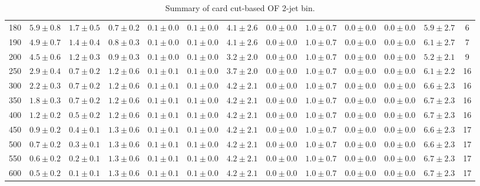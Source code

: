 \begin{table}
{\begin{center}
\begin{tabular}{l | c c | c c c c c c c c  | c c}
180 & $5.9\pm0.8$ & $1.7\pm0.5$ & $0.7\pm0.2$ & $0.1\pm0.0$ & $0.1\pm0.0$ & $4.1\pm2.6$ & $0.0\pm0.0$ & $1.0\pm0.7$ & $0.0\pm0.0$ & $0.0\pm0.0$ & $5.9\pm2.7$ & 6 \\
190 & $4.9\pm0.7$ & $1.4\pm0.4$ & $0.8\pm0.3$ & $0.1\pm0.0$ & $0.1\pm0.0$ & $4.1\pm2.6$ & $0.0\pm0.0$ & $1.0\pm0.7$ & $0.0\pm0.0$ & $0.0\pm0.0$ & $6.1\pm2.7$ & 7 \\
200 & $4.5\pm0.6$ & $1.2\pm0.3$ & $0.9\pm0.3$ & $0.1\pm0.0$ & $0.1\pm0.0$ & $3.2\pm2.0$ & $0.0\pm0.0$ & $1.0\pm0.7$ & $0.0\pm0.0$ & $0.0\pm0.0$ & $5.2\pm2.1$ & 9 \\
250 & $2.9\pm0.4$ & $0.7\pm0.2$ & $1.2\pm0.6$ & $0.1\pm0.1$ & $0.1\pm0.0$ & $3.7\pm2.0$ & $0.0\pm0.0$ & $1.0\pm0.7$ & $0.0\pm0.0$ & $0.0\pm0.0$ & $6.1\pm2.2$ & 16 \\
300 & $2.2\pm0.3$ & $0.7\pm0.2$ & $1.2\pm0.6$ & $0.1\pm0.1$ & $0.1\pm0.0$ & $4.2\pm2.1$ & $0.0\pm0.0$ & $1.0\pm0.7$ & $0.0\pm0.0$ & $0.0\pm0.0$ & $6.6\pm2.3$ & 16 \\
350 & $1.8\pm0.3$ & $0.7\pm0.2$ & $1.2\pm0.6$ & $0.1\pm0.1$ & $0.1\pm0.0$ & $4.2\pm2.1$ & $0.0\pm0.0$ & $1.0\pm0.7$ & $0.0\pm0.0$ & $0.0\pm0.0$ & $6.7\pm2.3$ & 16 \\
400 & $1.2\pm0.2$ & $0.5\pm0.2$ & $1.2\pm0.6$ & $0.1\pm0.1$ & $0.1\pm0.0$ & $4.2\pm2.1$ & $0.0\pm0.0$ & $1.0\pm0.7$ & $0.0\pm0.0$ & $0.0\pm0.0$ & $6.7\pm2.3$ & 16 \\
450 & $0.9\pm0.2$ & $0.4\pm0.1$ & $1.3\pm0.6$ & $0.1\pm0.1$ & $0.1\pm0.0$ & $4.2\pm2.1$ & $0.0\pm0.0$ & $1.0\pm0.7$ & $0.0\pm0.0$ & $0.0\pm0.0$ & $6.6\pm2.3$ & 17 \\
500 & $0.7\pm0.2$ & $0.3\pm0.1$ & $1.3\pm0.6$ & $0.1\pm0.1$ & $0.1\pm0.0$ & $4.2\pm2.1$ & $0.0\pm0.0$ & $1.0\pm0.7$ & $0.0\pm0.0$ & $0.0\pm0.0$ & $6.6\pm2.3$ & 17 \\
550 & $0.6\pm0.2$ & $0.2\pm0.1$ & $1.3\pm0.6$ & $0.1\pm0.1$ & $0.1\pm0.0$ & $4.2\pm2.1$ & $0.0\pm0.0$ & $1.0\pm0.7$ & $0.0\pm0.0$ & $0.0\pm0.0$ & $6.7\pm2.3$ & 17 \\
600 & $0.5\pm0.2$ & $0.1\pm0.1$ & $1.3\pm0.6$ & $0.1\pm0.1$ & $0.1\pm0.0$ & $4.2\pm2.1$ & $0.0\pm0.0$ & $1.0\pm0.7$ & $0.0\pm0.0$ & $0.0\pm0.0$ & $6.7\pm2.3$ & 17 \\
\hline
\end{tabular}
\end{center}
}
\caption{Summary of card cut-based OF 2-jet bin.}
\end{table}
